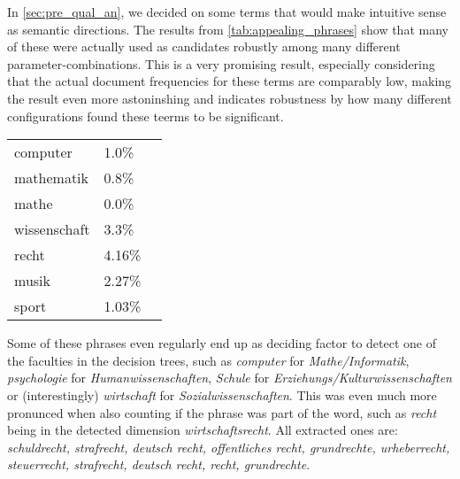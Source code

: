 In \autoref{sec:pre_qual_an}, we decided on some terms that would make intuitive sense as semantic directions. The results from \autoref{tab:appealing_phrases} show that many of these were actually used as candidates robustly among many different parameter-combinations. This is a very promising result, especially considering that the actual document frequencies for these terms are comparably low, making the result even more astoninshing and indicates robustness by how many different configurations found these teerms to be significant. 
\begingroup
\renewcommand{\arraystretch}{0.75}
\begin{tabular}{lll}
    computer     & 1.0\% \\
    mathematik   & 0.8\% \\
    mathe        & 0.0\% \\
    wissenschaft & 3.3\% \\
    recht        & 4.16\% \\
    musik        & 2.27\% \\
    sport        & 1.03\% 
\end{tabular}
\endgroup

Some of these phrases even regularly end up as deciding factor to detect one of the faculties in the decision trees, such as \textit{computer} for \textit{Mathe/Informatik}, \textit{psychologie} for \textit{Humanwissenschaften}, \textit{Schule} for \textit{Erziehungs/Kulturwissenschaften} or (interestingly) \textit{wirtschaft} for \textit{Sozialwissenschaften}. This was even much more pronunced when also counting if the phrase was part of the word, such as \textit{recht} being in the detected dimension \textit{wirtschaftsrecht}. All extracted ones are: \textit{schuldrecht, strafrecht, deutsch recht, offentliches recht, grundrechte, urheberrecht, steuerrecht, strafrecht, deutsch recht, recht, grundrechte}.



